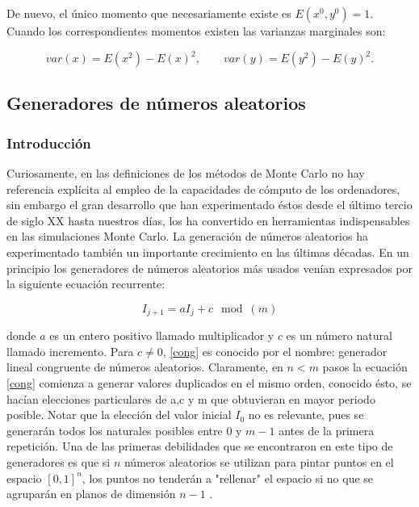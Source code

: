 \documentclass[../proyecto.tex]{memoir}
\begin{document}
De nuevo, el único momento que necesariamente existe es $E(x^{0},y^{0})=1$. Cuando los correspondientes momentos existen las varianzas marginales son:

\begin{equation*}
var(x) =  E(x^{2})-E(x)^{2}, \qquad var(y) =  E(y^{2})-E(y)^{2}.
\end{equation*}




\subsection{Generadores de números aleatorios}

\subsubsection{Introducción}

Curiosamente, en las definiciones de los métodos de Monte Carlo no hay referencia explícita al empleo de la capacidades de cómputo de los ordenadores, sin embargo el gran desarrollo que han experimentado éstos desde el último tercio de siglo XX hasta nuestros días, los ha convertido en herramientas indispensables en las simulaciones Monte Carlo. La generación de números aleatorios ha experimentado también un importante crecimiento en las últimas décadas. En un principio los generadores de números aleatorios  más usados venían expresados por la siguiente ecuación recurrente:

\begin{equation} \label{cong}
I_{j+1} = aI_{j} +c \mod (m)
\end{equation}

donde $a$ es un entero positivo llamado multiplicador y $c$ es un número natural llamado incremento. Para $c \neq 0$, \ref{cong} es conocido por el nombre: generador lineal congruente de números aleatorios. Claramente, en $n<m$ pasos la ecuación \ref{cong} comienza a generar valores duplicados en el mismo orden, conocido ésto, se hacían elecciones particulares de a,c y m que obtuvieran en mayor periodo posible. Notar que la elección del valor inicial $I_{0}$ no es relevante, pues se generarán todos los naturales posibles entre $0$ y $m-1$ antes de la primera repetición. Una de las primeras debilidades que se encontraron en este tipo de generadores es que si $n$ números aleatorios se utilizan para pintar puntos en el espacio $[0,1]^{n}$, los puntos no tenderán a "rellenar" el espacio si no que se agruparán en planos de dimensión $n-1$ \cite{planos}. 
\end{document}
